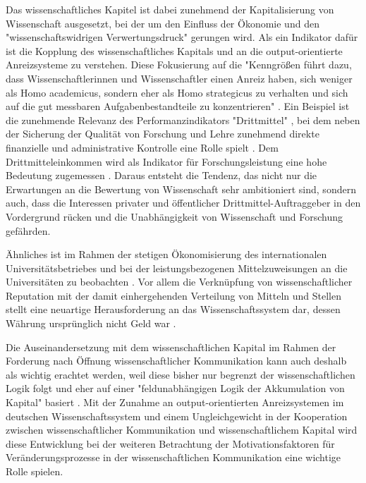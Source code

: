Das wissenschaftliches Kapitel ist dabei zunehmend der Kapitalisierung von Wissenschaft ausgesetzt, bei der um den Einfluss der Ökonomie und den "wissenschaftswidrigen Verwertungsdruck"  \cite[:12]{Neidhardt_2006} gerungen wird. Als ein Indikator dafür ist die Kopplung des wissenschaftliches Kapitals und an die output-orientierte Anreizsysteme zu verstehen. Diese Fokusierung auf die "Kenngrößen führt dazu, dass Wissenschaftlerinnen und Wissenschaftler einen Anreiz haben, sich weniger als Homo academicus, sondern eher als Homo strategicus zu verhalten und sich auf die gut messbaren Aufgabenbestandteile zu konzentrieren" \cite{Frost_2014}. Ein Beispiel ist die zunehmende Relevanz des Performanzindikators "Drittmittel" \cite{Fabrizio_2008} \cite{Jansen_2007}, bei dem neben der Sicherung der Qualität von Forschung und Lehre zunehmend direkte finanzielle und administrative Kontrolle eine Rolle spielt \cite{Barl_sius_2008}. Dem Drittmitteleinkommen wird als Indikator für Forschungsleistung eine hohe Bedeutung zugemessen \cite{Jansen_2007}. Daraus entsteht die Tendenz, das nicht nur die Erwartungen an die Bewertung von Wissenschaft sehr ambitioniert sind, sondern auch, dass die Interessen privater und öffentlicher Drittmittel-Auftraggeber in den Vordergrund rücken und die Unabhängigkeit von Wissenschaft und Forschung gefährden.

Ähnliches ist im Rahmen der stetigen Ökonomisierung des internationalen Universitätsbetriebes \cite{brembs2015open} und bei der leistungsbezogenen Mittelzuweisungen an die Universitäten zu beobachten \cite[:12]{Neidhardt_2006}. Vor allem die Verknüpfung von wissenschaftlicher Reputation mit der damit einhergehenden Verteilung von Mitteln und Stellen stellt eine neuartige Herausforderung an das Wissenschaftssystem dar, dessen Währung ursprünglich nicht Geld war \cite{hanekop_2006}.

Die Auseinandersetzung mit dem wissenschaftlichen Kapital im Rahmen der Forderung nach Öffnung wissenschaftlicher Kommunikation kann auch deshalb als wichtig erachtet werden, weil diese bisher nur begrenzt der wissenschaftlichen Logik folgt und eher auf einer "feldunabhängigen Logik der Akkumulation von Kapital" basiert \cite{herb_2006}. Mit der Zunahme an output-orientierten Anreizsystemen im deutschen Wissenschaftssystem \cite{osterloh2008anreize} und einem Ungleichgewicht in der Kooperation zwischen wissenschaftlicher Kommunikation und wissenschaftlichem Kapital wird diese Entwicklung bei der weiteren Betrachtung der Motivationsfaktoren für Veränderungsprozesse in der wissenschaftlichen Kommunikation eine wichtige Rolle spielen.

